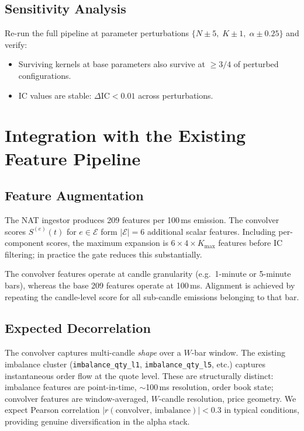 \documentclass[11pt,a4paper]{article}
\theoremstyle{definition}
\theoremstyle{plain}
\begin{document}
\subsection{Sensitivity Analysis}

Re-run the full pipeline at parameter perturbations $\{N \pm 5,\; K \pm 1,\;
\alpha \pm 0.25\}$ and verify:
\begin{itemize}
    \item[(i)] Surviving kernels at base parameters also survive at $\geq 3/4$ of
               perturbed configurations.
    \item[(ii)] IC values are stable: $\Delta\mathrm{IC} < 0.01$ across perturbations.
\end{itemize}

\section{Integration with the Existing Feature Pipeline}
\label{sec:integration}

\subsection{Feature Augmentation}

The NAT ingestor produces 209 features per 100\,ms emission. The convolver scores
$S^{(e)}(t)$ for $e \in \mathcal{E}$ form $|\mathcal{E}| = 6$ additional scalar
features. Including per-component scores, the maximum expansion is $6 \times 4 \times
K_{\max}$ features before IC filtering; in practice the gate reduces this substantially.

The convolver features operate at candle granularity (e.g.\ 1-minute or 5-minute bars),
whereas the base 209 features operate at 100\,ms. Alignment is achieved by repeating the
candle-level score for all sub-candle emissions belonging to that bar.

\subsection{Expected Decorrelation}

The convolver captures multi-candle \emph{shape} over a $W$-bar window. The existing
imbalance cluster (\texttt{imbalance\_qty\_l1}, \texttt{imbalance\_qty\_l5}, etc.)
captures instantaneous order flow at the quote level. These are structurally distinct:
imbalance features are point-in-time, $\sim$100\,ms resolution, order book state;
convolver features are window-averaged, $W$-candle resolution, price geometry. We expect
Pearson correlation $|r(\text{convolver},\, \text{imbalance})| < 0.3$ in typical
conditions, providing genuine diversification in the alpha stack.
\end{document}
